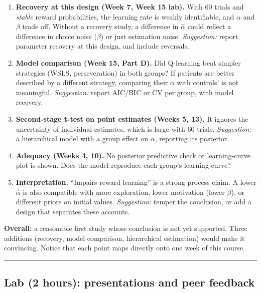 \begin{enumerate}
\def\labelenumi{\arabic{enumi}.}
\tightlist
\item
  \textbf{Recovery at this design (Week 7, Week 15 lab).} With 60 trials
  and \emph{stable} reward probabilities, the learning rate is weakly
  identifiable, and \(\alpha\) and \(\beta\) trade off. Without a
  recovery study, a difference in \(\hat\alpha\) could reflect a
  difference in choice noise (\(\beta\)) or just estimation noise.
  \emph{Suggestion:} report parameter recovery at this design, and
  include reversals.
\item
  \textbf{Model comparison (Week 15, Part D).} Did Q-learning beat
  simpler strategies (WSLS, perseveration) in both groups? If patients
  are better described by a different strategy, comparing their
  \(\alpha\) with controls' is not meaningful. \emph{Suggestion:} report
  AIC/BIC or CV per group, with model recovery.
\item
  \textbf{Second-stage t-test on point estimates (Weeks 5, 13).} It
  ignores the uncertainty of individual estimates, which is large with
  60 trials. \emph{Suggestion:} a hierarchical model with a group effect
  on \(\alpha\), reporting its posterior.
\item
  \textbf{Adequacy (Weeks 4, 10).} No posterior predictive check or
  learning-curve plot is shown. Does the model reproduce each group's
  learning curve?
\item
  \textbf{Interpretation.} ``Impairs reward learning'' is a strong
  process claim. A lower \(\hat\alpha\) is also compatible with more
  exploration, lower motivation (lower \(\beta\)), or different priors
  on initial values. \emph{Suggestion:} temper the conclusion, or add a
  design that separates these accounts.
\end{enumerate}

\textbf{Overall:} a reasonable first study whose conclusion is not yet
supported. Three additions (recovery, model comparison, hierarchical
estimation) would make it convincing. Notice that each point maps
directly onto one week of this course.

\begin{center}\rule{0.5\linewidth}{0.5pt}\end{center}

\subsection{Lab (2 hours): presentations and peer feedback}

